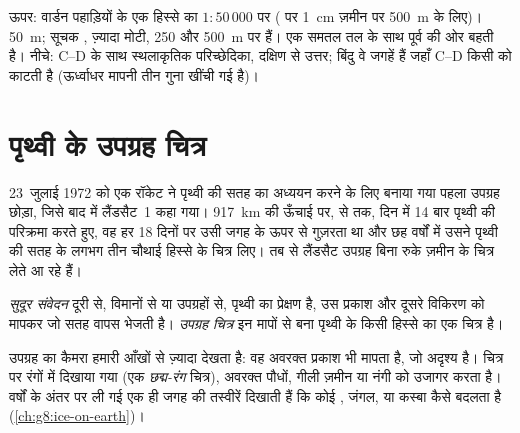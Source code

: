 \begin{omfigure}
{\small ऊपर: वार्डन पहाड़ियों के एक हिस्से का $1 : 50\,000$ पर 
( पर 1~cm ज़मीन पर \qty{500}{m} के लिए)।  \qty{50}{m}; सूचक
, ज़्यादा मोटी, 250 और \qty{500}{m} पर हैं।  एक समतल  तल के साथ
पूर्व की ओर बहती है। नीचे: C--D के साथ स्थलाकृतिक परिच्छेदिका, दक्षिण से उत्तर; बिंदु वे
जगहें हैं जहाँ C--D किसी  को काटती है (ऊर्ध्वाधर मापनी तीन गुना खींची गई
है)।}
\label{fig:g9:maps-of-the-earth:topo}
\end{omfigure}

\section{पृथ्वी के उपग्रह चित्र}

23~जुलाई 1972 को एक रॉकेट ने पृथ्वी की सतह का अध्ययन करने के लिए बनाया गया पहला उपग्रह
छोड़ा, जिसे बाद में लैंडसैट~1 कहा गया। \qty{917}{km} की ऊँचाई पर,  से  तक,
दिन में 14 बार पृथ्वी की परिक्रमा करते हुए, वह हर 18 दिनों पर उसी जगह के ऊपर से गुज़रता था
और छह वर्षों में उसने पृथ्वी की सतह के लगभग तीन चौथाई हिस्से के चित्र लिए। तब से लैंडसैट
उपग्रह बिना रुके ज़मीन के चित्र लेते आ रहे
हैं।

\begin{definition}[सुदूर संवेदन और उपग्रह चित्र]\label{def:g9:maps-of-the-earth:remote-sensing}
\emph{सुदूर संवेदन} दूरी से, विमानों से या उपग्रहों से, पृथ्वी का
प्रेक्षण है, उस प्रकाश और दूसरे विकिरण को मापकर जो सतह वापस भेजती है। \emph{उपग्रह
चित्र} इन मापों से बना पृथ्वी के किसी हिस्से का एक
चित्र
है।
\end{definition}

उपग्रह का कैमरा हमारी आँखों से ज़्यादा देखता है: वह अवरक्त प्रकाश भी मापता है, जो अदृश्य है।
चित्र पर रंगों में दिखाया गया (एक \emph{छद्म-रंग} चित्र), अवरक्त पौधों, गीली ज़मीन या नंगी
 को उजागर करता है। वर्षों के अंतर पर ली गई एक ही जगह की तस्वीरें दिखाती हैं कि कोई ,
जंगल,  या कस्बा कैसे बदलता है
(\cref{ch:g8:ice-on-earth})।

